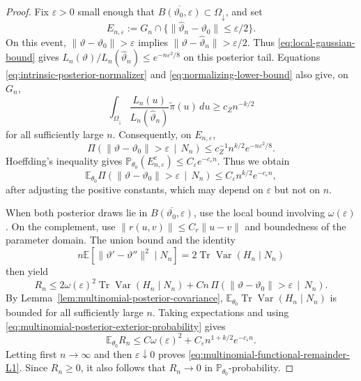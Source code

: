 \documentclass{article}
\theoremstyle{named}
\theoremstyle{named1}
\theoremstyle{plain}
\theoremstyle{remark}
\begin{document}
\begin{proof}
Fix $\varepsilon>0$ small enough that
$\overline{B(\vartheta_0,\varepsilon)}\subset\Omega_{\downarrow}$,
and set
\[
    E_{n,\varepsilon}
    :=G_n\cap
    \{\|\widehat\vartheta_n-\vartheta_0\|\leq\varepsilon/2\}.
\]
On this event, $\|\vartheta-\vartheta_0\|>\varepsilon$ implies
$\|\vartheta-\widehat\vartheta_n\|>\varepsilon/2$. Thus
\eqref{eq:local-gaussian-bound} gives
$L_n(\vartheta)/L_n(\widehat\vartheta_n)\leq e^{-n\varepsilon^2/8}$
on this posterior tail. Equations
\eqref{eq:intrinsic-posterior-normalizer} and
\eqref{eq:normalizing-lower-bound} also give, on $G_n$,
\[
    \int_{\Omega_{\downarrow}}
    \frac{L_n(u)}{L_n(\widehat\vartheta_n)}\widetilde\pi(u)\,du
    \geq c_Zn^{-k/2}
\]
for all sufficiently large $n$. Consequently, on $E_{n,\varepsilon}$,
\[
    \Pi\!\left(
        \|\vartheta-\vartheta_0\|>\varepsilon\,\middle|\,N_n
    \right)
    \leq c_Z^{-1}n^{k/2}e^{-n\varepsilon^2/8}.
\]
Hoeffding's inequality gives
$\mathbb P_{\theta_0}(E_{n,\varepsilon}^c)
 \leq C_\varepsilon e^{-c_\varepsilon n}$.
Thus we obtain
\begin{equation}
    \mathbb E_{\theta_0}\Pi\!\left(
        \|\vartheta-\vartheta_0\|>\varepsilon\,\middle|\,N_n
    \right)
    \leq C_\varepsilon n^{k/2}e^{-c_\varepsilon n},
    \label{eq:multinomial-posterior-exterior-probability}
\end{equation}
after adjusting the positive constants, which may depend on $\varepsilon$
but not on $n$.

When both posterior draws lie in
$\overline{B(\vartheta_0,\varepsilon)}$, use the local bound involving
$\omega(\varepsilon)$. On the complement, use
$\|r(u,v)\|\leq C_r\|u-v\|$ and boundedness of the parameter domain.
The union bound and the identity
\[
    n\mathbb E[\|\vartheta'-\vartheta''\|^2\mid N_n]
    =2\operatorname{Tr}\operatorname{Var}(H_n\mid N_n)
\]
then yield
\[
    R_n
    \leq
    2\omega(\varepsilon)^2
      \operatorname{Tr}\operatorname{Var}(H_n\mid N_n)
    +Cn\,\Pi\!\left(
        \|\vartheta-\vartheta_0\|>\varepsilon\,\middle|\,N_n
    \right).
\]
By Lemma~\ref{lem:multinomial-posterior-covariance},
$\mathbb E_{\theta_0}\operatorname{Tr}\operatorname{Var}(H_n\mid N_n)$
is bounded for all sufficiently large $n$. Taking expectations and using
\eqref{eq:multinomial-posterior-exterior-probability} gives
\[
    \mathbb E_{\theta_0}R_n
    \leq C\omega(\varepsilon)^2
       +C_\varepsilon n^{1+k/2}e^{-c_\varepsilon n}.
\]
Letting first $n\to\infty$ and then $\varepsilon\downarrow0$ proves
\eqref{eq:multinomial-functional-remainder-L1}. Since $R_n\geq0$, it
also follows that $R_n\to0$ in $\mathbb P_{\theta_0}$-probability.


\end{proof}
\end{document}
